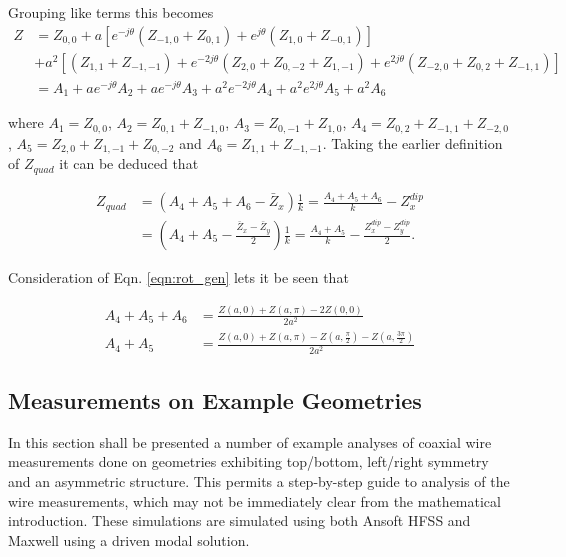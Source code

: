 Grouping like terms this becomes
\begin{align}
Z   &=Z_{0,0} + a\left[ e^{-j\theta}\left( Z_{-1,0} + Z_{0,1} \right) +  e^{j\theta}\left( Z_{1,0} + Z_{-0,1} \right)\right] \nonumber \\
     &+a^{2}\left[ \left( Z_{1,1} + Z_{-1,-1} \right) + e^{-2j\theta} \left(  Z_{2,0} + Z_{0,-2} +Z_{1,-1} \right) + e^{2j\theta} \left( Z_{-2,0} + Z_{0,2} +Z_{-1,1} \right) \right] \nonumber \\
     &=A_{1} + ae^{-j\theta}A_{2} + ae^{-j\theta}A_{3}+ a^{2}e^{-2j\theta}A_{4} +a^{2}e^{2j\theta}A_{5} +  a^{2}A_{6}
\label{eqn:rot_gen}
\end{align}

where $A_{1} = Z_{0,0}$, $A_{2} = Z_{0,1}+Z_{-1,0}$, $A_{3} = Z_{0,-1}+Z_{1,0}$, $A_{4} = Z_{0,2}+Z_{-1,1}+Z_{-2,0}$, $A_{5} = Z_{2,0}+Z_{1,-1}+Z_{0,-2}$ and $A_{6}=Z_{1,1}+Z_{-1,-1}$. Taking the earlier definition of $Z_{quad}$ it can be deduced that

\begin{align}
Z_{quad} & = \left( A_{4}+A_{5}+A_{6} - \bar{Z}_{x} \right)\frac{1}{k} =\frac{ A_{4}+A_{5}+A_{6}}{k} - Z^{dip}_{x} \\  
	    & = \left( A_{4}+A_{5} - \frac{\bar{Z}_{x}- \bar{Z}_{y}}{2}\right)\frac{1}{k} =\frac{ A_{4}+A_{5}}{k} - \frac{Z^{dip}_{x}-Z^{dip}_{y} }{2}.
\end{align}

Consideration of Eqn. \ref{eqn:rot_gen} lets it be seen that

\begin{align}
 A_{4}+A_{5}+A_{6} & = \frac{Z\left( a,0 \right)+Z\left( a,\pi \right) - 2Z\left( 0,0 \right)}{2a^{2}} \\
 A_{4}+A_{5} & = \frac{Z\left( a,0 \right)+Z\left( a,\pi \right) - Z\left( a,\frac{\pi}{2} \right)-Z\left( a,\frac{3\pi}{2} \right)}{2a^{2}}
\end{align} 

\subsection{Measurements on Example Geometries}

In this section shall be presented a number of example analyses of coaxial wire measurements done on geometries exhibiting top/bottom, left/right symmetry and an asymmetric structure. This permits a step-by-step guide to analysis of the wire measurements, which may not be immediately clear from the mathematical introduction. These simulations are simulated using both Ansoft HFSS and Maxwell using a driven modal solution. 

